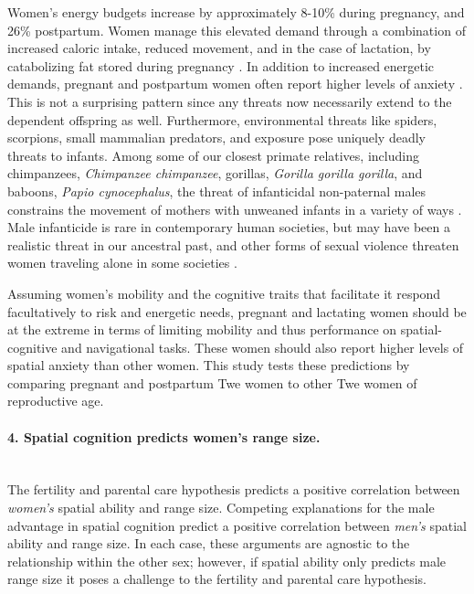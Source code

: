 Women's energy budgets increase by approximately 8-10\% during pregnancy, and 26\% postpartum.  Women manage this elevated demand through a combination of increased caloric intake, reduced movement, and in the case of lactation, by catabolizing fat stored during pregnancy \citep{dufour2002comparative}.  In addition to increased energetic demands, pregnant and postpartum women often report higher levels of anxiety \citep{heron2004course, wenzel2003prevalence}.  This is not a surprising pattern since any threats now necessarily extend to the dependent offspring as well.  Furthermore, environmental threats like spiders, scorpions, small mammalian predators, and exposure pose uniquely deadly threats to infants.  Among some of our closest primate relatives, including chimpanzees, \emph{Chimpanzee chimpanzee}, gorillas, \emph{Gorilla gorilla gorilla}, and baboons, \emph{Papio cynocephalus}, the threat of infanticidal non-paternal males constrains the movement of mothers with unweaned infants in a variety of ways \citep{collins1984infanticide, watts1989infanticide, smuts1992male, stokes2003female, watts2000infanticide}.  Male infanticide is rare in contemporary human societies, but may have been a realistic threat in our ancestral past, and other forms of sexual violence threaten women traveling alone in some societies \cite{gregor1987anxious}.

Assuming women's mobility and the cognitive traits that facilitate it respond facultatively to risk and energetic needs, pregnant and lactating women should be at the extreme in terms of limiting mobility and thus performance on spatial-cognitive and navigational tasks.  These women should also report higher levels of spatial anxiety than other women.  This study tests these predictions by comparing pregnant and postpartum Twe women to other Twe women of reproductive age.

\paragraph{4. Spatial cognition predicts women's range size.}\mbox{}\\

The fertility and parental care hypothesis predicts a positive correlation between \emph{women's} spatial ability and range size. Competing explanations for the male advantage in spatial cognition predict a positive correlation between \emph{men's} spatial ability and range size.  In each case, these arguments are agnostic to the relationship within the other sex; however, if spatial ability only predicts male range size it poses a challenge to the fertility and parental care hypothesis.  


